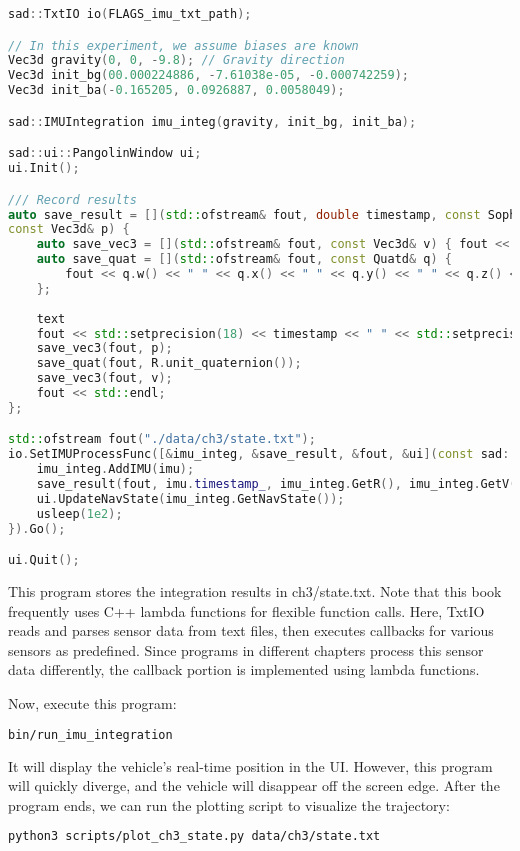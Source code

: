 \begin{lstlisting}[language=c++,caption=ch3/run_imu_integration.cc]
sad::TxtIO io(FLAGS_imu_txt_path);

// In this experiment, we assume biases are known
Vec3d gravity(0, 0, -9.8); // Gravity direction
Vec3d init_bg(00.000224886, -7.61038e-05, -0.000742259);
Vec3d init_ba(-0.165205, 0.0926887, 0.0058049);

sad::IMUIntegration imu_integ(gravity, init_bg, init_ba);

sad::ui::PangolinWindow ui;
ui.Init();

/// Record results
auto save_result = [](std::ofstream& fout, double timestamp, const Sophus::SO3d& R, const Vec3d& v,
const Vec3d& p) {
	auto save_vec3 = [](std::ofstream& fout, const Vec3d& v) { fout << v[0] << " " << v[1] << " " << v[2] << " "; };
	auto save_quat = [](std::ofstream& fout, const Quatd& q) {
		fout << q.w() << " " << q.x() << " " << q.y() << " " << q.z() << " ";
	};
	
	text
	fout << std::setprecision(18) << timestamp << " " << std::setprecision(9);
	save_vec3(fout, p);
	save_quat(fout, R.unit_quaternion());
	save_vec3(fout, v);
	fout << std::endl;
};

std::ofstream fout("./data/ch3/state.txt");
io.SetIMUProcessFunc([&imu_integ, &save_result, &fout, &ui](const sad::IMU& imu) {
	imu_integ.AddIMU(imu);
	save_result(fout, imu.timestamp_, imu_integ.GetR(), imu_integ.GetV(), imu_integ.GetP());
	ui.UpdateNavState(imu_integ.GetNavState());
	usleep(1e2);
}).Go();

ui.Quit();
\end{lstlisting}

This program stores the integration results in ch3/state.txt. Note that this book frequently uses C++ lambda functions for flexible function calls. Here, TxtIO reads and parses sensor data from text files, then executes callbacks for various sensors as predefined. Since programs in different chapters process this sensor data differently, the callback portion is implemented using lambda functions.

Now, execute this program:
\begin{lstlisting}[language=sh, caption=Terminal input:]
bin/run_imu_integration
\end{lstlisting}

It will display the vehicle's real-time position in the UI. However, this program will quickly diverge, and the vehicle will disappear off the screen edge. After the program ends, we can run the plotting script to visualize the trajectory:
\begin{lstlisting}[language=sh, caption=Terminal input:]
python3 scripts/plot_ch3_state.py data/ch3/state.txt
\end{lstlisting}

